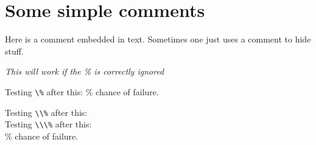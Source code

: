 \documentclass{article}
\begin{document}
\section{Some simple comments}
Here %
is a comment embedded in text.
Sometimes one just uses
a comment to hide stuff.

{\it This will work %
if the \% is correctly ignored}

Testing \verb#\%# after this: \% chance of failure.

Testing \verb#\\%# after this: \\%

Testing \verb#\\\%# after this: \\\% chance of failure.
\end{document}
